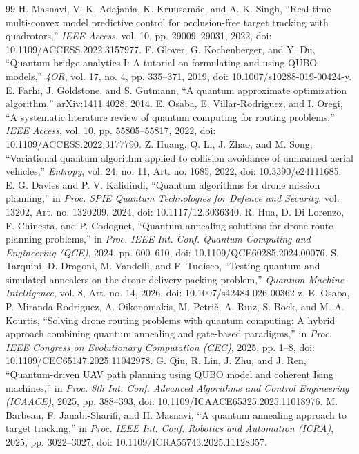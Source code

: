 \documentclass[10pt,conference]{IEEEtran}
\begin{document}
\begin{thebibliography}{99}
 H. Masnavi, V. K. Adajania, K. Kruusam\"ae, and A. K. Singh, ``Real-time multi-convex model predictive control for occlusion-free target tracking with quadrotors,'' \emph{IEEE Access}, vol. 10, pp. 29009--29031, 2022, doi: 10.1109/ACCESS.2022.3157977.
 F. Glover, G. Kochenberger, and Y. Du, ``Quantum bridge analytics I: A tutorial on formulating and using QUBO models,'' \emph{4OR}, vol. 17, no. 4, pp. 335--371, 2019, doi: 10.1007/s10288-019-00424-y.
 E. Farhi, J. Goldstone, and S. Gutmann, ``A quantum approximate optimization algorithm,'' arXiv:1411.4028, 2014.
 E. Osaba, E. Villar-Rodriguez, and I. Oregi, ``A systematic literature review of quantum computing for routing problems,'' \emph{IEEE Access}, vol. 10, pp. 55805--55817, 2022, doi: 10.1109/ACCESS.2022.3177790.
 Z. Huang, Q. Li, J. Zhao, and M. Song, ``Variational quantum algorithm applied to collision avoidance of unmanned aerial vehicles,'' \emph{Entropy}, vol. 24, no. 11, Art. no. 1685, 2022, doi: 10.3390/e24111685.
 E. G. Davies and P. V. Kalidindi, ``Quantum algorithms for drone mission planning,'' in \emph{Proc. SPIE Quantum Technologies for Defence and Security}, vol. 13202, Art. no. 1320209, 2024, doi: 10.1117/12.3036340.
 R. Hua, D. Di Lorenzo, F. Chinesta, and P. Codognet, ``Quantum annealing solutions for drone route planning problems,'' in \emph{Proc. IEEE Int. Conf. Quantum Computing and Engineering (QCE)}, 2024, pp. 600--610, doi: 10.1109/QCE60285.2024.00076.
 S. Tarquini, D. Dragoni, M. Vandelli, and F. Tudisco, ``Testing quantum and simulated annealers on the drone delivery packing problem,'' \emph{Quantum Machine Intelligence}, vol. 8, Art. no. 14, 2026, doi: 10.1007/s42484-026-00362-z.
 E. Osaba, P. Miranda-Rodriguez, A. Oikonomakis, M. Petri\v{c}, A. Ruiz, S. Bock, and M.-A. Kourtis, ``Solving drone routing problems with quantum computing: A hybrid approach combining quantum annealing and gate-based paradigms,'' in \emph{Proc. IEEE Congress on Evolutionary Computation (CEC)}, 2025, pp. 1--8, doi: 10.1109/CEC65147.2025.11042978.
 G. Qiu, R. Lin, J. Zhu, and J. Ren, ``Quantum-driven UAV path planning using QUBO model and coherent Ising machines,'' in \emph{Proc. 8th Int. Conf. Advanced Algorithms and Control Engineering (ICAACE)}, 2025, pp. 388--393, doi: 10.1109/ICAACE65325.2025.11018976.
 M. Barbeau, F. Janabi-Sharifi, and H. Masnavi, ``A quantum annealing approach to target tracking,'' in \emph{Proc. IEEE Int. Conf. Robotics and Automation (ICRA)}, 2025, pp. 3022--3027, doi: 10.1109/ICRA55743.2025.11128357.

\end{thebibliography}
\end{document}
